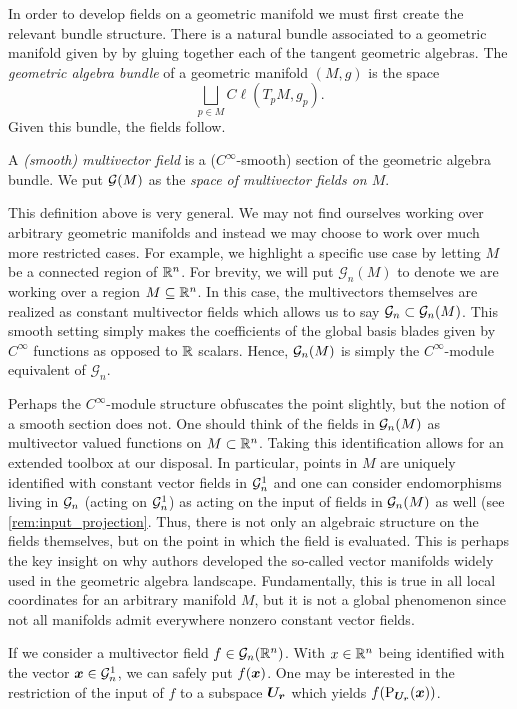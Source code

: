 In order to develop fields on a geometric manifold we must first create the relevant bundle structure. There is a natural bundle associated to a  geometric manifold given by by gluing together each of the tangent geometric algebras. The \emph{geometric algebra bundle} of a geometric manifold $(M,g)$ is the space
\begin{equation}
\bigsqcup_{p \in M} C\ell(T_pM,g_p).
\end{equation}
Given this bundle, the fields follow.
\begin{definition}
A \emph{(smooth) multivector field} is a ($C^{\infty}$-smooth) section of the geometric algebra bundle. We put $\mathcal{G}(M)$ as the \emph{space of multivector fields on $M$}.
\end{definition}
This definition above is very general. We may not find ourselves working over arbitrary geometric manifolds and instead we may choose to work over much more restricted cases. For example, we highlight a specific use case by letting $M$ be a connected region of $\mathbb{R}^n$. For brevity, we will put $\mathcal{G}_n(M)$ to denote we are working over a region $M\subseteq \mathbb{R}^n$. In this case, the multivectors themselves are realized as constant multivector fields which allows us to say $\mathcal{G}_n \subset \mathcal{G}_n(M)$. This smooth setting simply makes the coefficients of the global basis blades given by $C^\infty$ functions as opposed to $\mathbb{R}$ scalars.  Hence, $\mathcal{G}_n(M)$ is simply the $C^{\infty}$-module equivalent of $\mathcal{G}_n$.

Perhaps the $C^\infty$-module structure obfuscates the point slightly, but the notion of a smooth section does not.  One should think of the fields in $\mathcal{G}_n(M)$ as multivector valued functions on $M \subset \mathbb{R}^n$. Taking this identification allows for an extended toolbox at our disposal. In particular, points in $M$ are uniquely identified with constant vector fields in $\mathcal{G}_n^1$ and one can consider endomorphisms living in $\mathcal{G}_n$ (acting on $\mathcal{G}_n^1$) as acting on the input of fields in $\mathcal{G}_n(M)$ as well (see \cref{rem:input_projection}.  Thus, there is not only an algebraic structure on the fields themselves, but on the point in which the field is evaluated.  This is perhaps the key insight on why authors developed the so-called vector manifolds widely used in the geometric algebra landscape. Fundamentally, this is true in all local coordinates for an arbitrary manifold $M$, but it is not a global phenomenon since not all manifolds admit everywhere nonzero constant vector fields. 

\begin{remark}
\label{rem:input_projection}
    If we consider a multivector field $f \in \mathcal{G}_n(\mathbb{R}^n)$. With $x\in \mathbb{R}^n$ being identified with the vector $\boldsymbol{x} \in \mathcal{G}_n^1$, we can safely put $f(\boldsymbol{x})$.  One may be interested in the restriction of the input of $f$ to a subspace $\boldsymbol{U_r}$ which yields $f(\operatorname{P}_{\boldsymbol{U_r}}(\boldsymbol{x}))$.  
\end{remark}


